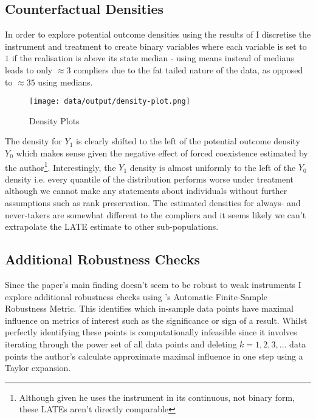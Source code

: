 \documentclass{article}
\begin{document}
\subsection*{Counterfactual Densities}
In order to explore potential outcome densities using the results of \cite{imbens-rubin}
I discretise the instrument and treatment to create binary variables where each variable is set to $1$ if the realisation is above its
state median - using means instead of medians leads to only $\approx 3$ compliers due to the fat tailed nature of the data, as opposed to $\approx 35$ using medians.


\begin{figure}[htbp]
    \centering
    \texttt{[image: data/output/density-plot.png]}
    \caption{Density Plots}
    \label{dens}
\end{figure}


The density for $Y_1$ is clearly shifted to the left of the potential outcome density $Y_0$ which makes sense given the negative effect 
of forced coexistence estimated by the author\footnote{Although given he uses the instrument in its continuous, not binary form, these LATEs aren't directly comparable}. Interestingly, the $Y_1$ density is almost uniformly to the left of the $Y_0$ density i.e. 
every quantile of the distribution performs worse under treatment although we cannot make any statements about individuals without 
further assumptions such as rank preservation. The estimated densities for always- and never-takers are somewhat different to the compliers 
and it seems likely we can't extrapolate the LATE estimate to other sub-populations.
\subsection*{Additional Robustness Checks}

Since the paper's main finding doesn't seem to be robust to weak instruments I explore additional robustness checks using 
\cite{amip}'s Automatic Finite-Sample Robustness Metric. This identifies which in-sample data points have maximal influence on 
 metrics of interest such as the significance or sign of a result. Whilst perfectly identifying these points is computationally infeasible
since it involves iterating through the power set of all data points and deleting $k = 1, 2, 3, ...$ data points the author's calculate approximate 
maximal influence in one step using a Taylor expansion.




\end{document}
